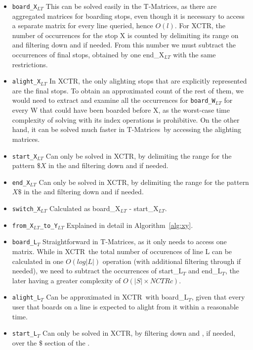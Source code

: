 \documentclass[runningheads]{llncs}
\newcommand{\acumm}{T-Matrices} %
\newcommand{\ctr}{XCTR}
\newcommand{\ctrq}{NCTRc}
\begin{document}
\begin{itemize}
    \item \texttt{board\_X$_{LT}$} This can be solved easily in the \acumm, as there are aggregated matrices for boarding stops, even though it is necessary to access a separate matrix for every line queried, hence $O(l)$. For \ctr, the number of occurrences for the stop X is counted by delimiting its range on  and filtering down  and  if needed. From this number we must subtract the occurrences of final stops, obtained by one end\_X$_{LT}$ with the same restrictions.
    \item \texttt{alight\_X$_{LT}$} In \ctr, the only alighting stops that are explicitly represented are the final stops. To obtain an approximated count of the rest of them, we would need to extract and examine all the occurrences for \texttt{board\_W$_{LT}$} for every W that could have been boarded before X, as the worst-case time complexity of solving with its index operations is prohibitive. On the other hand, it can be solved much faster in \acumm~by accessing the alighting matrices.
    \item \texttt{start\_X$_{LT}$} Can only be solved in \ctr, by delimiting the range for the pattern $\$X$ in the  and filtering down  and  if needed.
    \item \texttt{end\_X$_{LT}$} Can only be solved in \ctr, by delimiting the range for the pattern $X\$$ in the  and filtering down  and  if needed.
    \item \texttt{switch\_X$_{LT}$} Calculated as board\_X$_{LT}$ - start\_X$_{LT}$.
    \item \texttt{from\_X$_{LT}$\_to\_Y$_{LT}$} Explained in detail in Algorithm~\ref{alg:xy}.
    \item \texttt{board\_L$_T$} Straightforward in \acumm, as it only needs to access one matrix. While in \ctr~the total number of occurences of line L can be calculated in one $O(log|L|)$ operation (with additional filtering through  if needed), we need to subtract the occurrences of start\_L$_T$ and end\_L$_T$, the later having a greater complexity of $O(|S| \times \ctrq)$.
    \item \texttt{alight\_L$_T$} Can be approximated in \ctr~with board\_L$_T$, given that every user that boards on a line is expected to alight from it within a reasonable time.
    \item \texttt{start\_L$_T$} Can only be solved in \ctr, by filtering down  and , if needed, over the $\$$ section of the .

\end{itemize}
\end{document}
